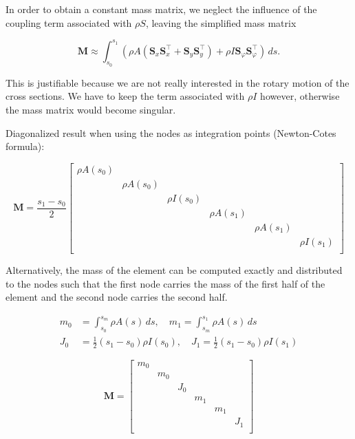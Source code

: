 In order to obtain a constant mass matrix, we neglect the influence of the coupling term associated with $\rho S$, leaving the simplified mass matrix

\begin{equation}
\boldsymbol{M} \approx \int_{s_0}^{s_1} \left(\rho A\left(\boldsymbol{S}_x\boldsymbol{S}_x^\intercal + \boldsymbol{S}_y\boldsymbol{S}_y^\intercal\right) + \rho I\boldsymbol{S}_\varphi\boldsymbol{S}_\varphi^\intercal\right)\,ds.
\end{equation}

This is justifiable because we are not really interested in the rotary motion of the cross sections.
We have to keep the term associated with $\rho I$ however, otherwise the mass matrix would become singular.

Diagonalized result when using the nodes as integration points (Newton-Cotes formula):

\begin{equation}
\boldsymbol{M} = \frac{s_1- s_0}{2}\begin{bmatrix}
\rho A(s_0) \\
& \rho A(s_0) \\
& & \rho I(s_0) \\
& & & \rho A(s_1) \\
& & & & \rho A(s_1) \\
& & & & & \rho I(s_1) \\
\end{bmatrix}
\end{equation}

Alternatively, the mass of the element can be computed exactly and distributed to the nodes such that the first node carries the mass of the first half of the element and the second node carries the second half.


\begin{align}
m_{0} &= \int_{s_0}^{s_m} \rho A(s)\,ds, \quad m_{1} = \int_{s_m}^{s_1} \rho A(s)\,ds \\
J_{0} &= \frac{1}{2}(s_1- s_0)\rho I(s_0), \quad J_{1} = \frac{1}{2}(s_1- s_0)\rho I(s_1)
\end{align}

\begin{equation}
\boldsymbol{M} = \begin{bmatrix}
m_0 \\
& m_0 \\
& & J_0 \\
& & & m_1 \\
& & & & m_1 \\
& & & & & J_1 \\
\end{bmatrix}
\end{equation}

